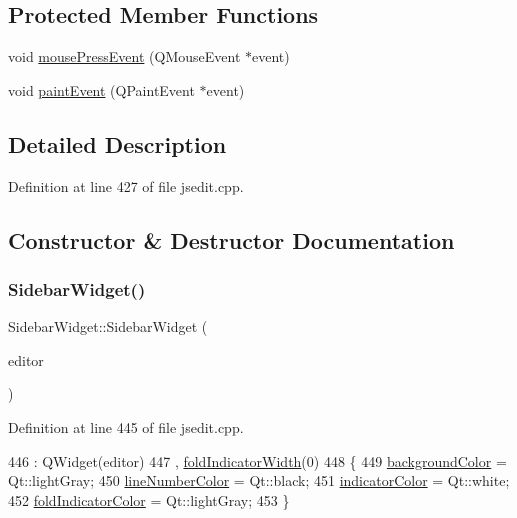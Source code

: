 \subsection*{Protected Member Functions}
\begin{DoxyCompactItemize}
\item 
void \hyperlink{class_sidebar_widget_a5908595bfafd6a963901894cec3224bb}{mouse\+Press\+Event} (Q\+Mouse\+Event $\ast$event)
\item 
void \hyperlink{class_sidebar_widget_ae74f39b64dca90cf88e35ccbbe9eb5b6}{paint\+Event} (Q\+Paint\+Event $\ast$event)
\end{DoxyCompactItemize}


\subsection{Detailed Description}


Definition at line 427 of file jsedit.\+cpp.



\subsection{Constructor \& Destructor Documentation}
\mbox{\label{class_sidebar_widget_adb5e207d7e93d3716178199118451364}} 
\subsubsection{\texorpdfstring{Sidebar\+Widget()}{SidebarWidget()}}
{\footnotesize\ttfamily Sidebar\+Widget\+::\+Sidebar\+Widget (\begin{DoxyParamCaption}\item[{\hyperlink{class_j_s_edit}{J\+S\+Edit} $\ast$}]{editor }\end{DoxyParamCaption})}



Definition at line 445 of file jsedit.\+cpp.


\begin{DoxyCode}
446     : QWidget(editor)
447     , \hyperlink{class_sidebar_widget_a8be447556cc4ec612153b05eec332513}{foldIndicatorWidth}(0)
448 \{
449     \hyperlink{class_sidebar_widget_a71151528db89c451ad8aa0c31694c27a}{backgroundColor} = Qt::lightGray;
450     \hyperlink{class_sidebar_widget_a0a577ea7fe9a4f2075fa19d1e601f987}{lineNumberColor} = Qt::black;
451     \hyperlink{class_sidebar_widget_a0221f90d581113d83c73af06e1738067}{indicatorColor} = Qt::white;
452     \hyperlink{class_sidebar_widget_afa52fb75135fc07142c40b10b6255fa5}{foldIndicatorColor} = Qt::lightGray;
453 \}
\end{DoxyCode}


